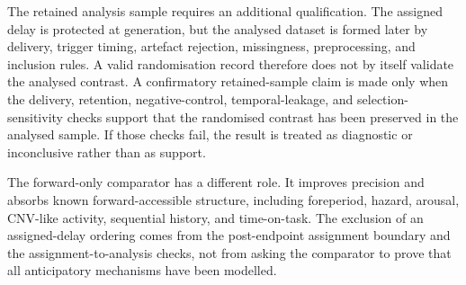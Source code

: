 \documentclass[11pt,a4paper]{article}
\theoremstyle{definition}
\begin{document}
The retained analysis sample requires an additional qualification. The assigned
delay is protected at generation, but the analysed dataset is formed later by
delivery, trigger timing, artefact rejection, missingness, preprocessing, and
inclusion rules. A valid randomisation record therefore does not by itself
validate the analysed contrast. A confirmatory retained-sample claim is made only
when the delivery, retention, negative-control, temporal-leakage, and
selection-sensitivity checks support that the randomised contrast has been
preserved in the analysed sample. If those checks fail, the result is treated as
diagnostic or inconclusive rather than as support.

The forward-only comparator has a different role. It improves precision and
absorbs known forward-accessible structure, including foreperiod, hazard,
arousal, CNV-like activity, sequential history, and time-on-task. The exclusion
of an assigned-delay ordering comes from the post-endpoint assignment boundary
and the assignment-to-analysis checks, not from asking the comparator to prove
that all anticipatory mechanisms have been modelled.
\end{document}
